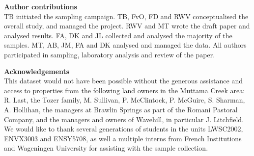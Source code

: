 \documentclass[, manuscript]{copernicus}
\begin{document}
\bigskip

\noindent \textbf{Author contributions}\\
TB initiated the sampling campaign. TB, FvO, FD and RWV conceptualised
the overall study, and managed the project. RWV and MT wrote the draft
paper and analysed results. FA, DK and JL collected and analysed the
majority of the samples. MT, AB, JM, FA and DK analysed and managed the
data. All authors participated in sampling, laboratory analysis and
review of the paper.

\bigskip

\noindent \textbf{Acknowledgements}\\
This dataset would not have been possible without the generous
assistance and access to properties from the following land owners in
the Muttama Creek area: R. Last, the Tozer family, M. Sullivan, P.
McClintock, P. McGuire, S. Sharman, A. Hollihan, the managers at Brawlin
Springs as part of the Romani Pastoral Company, and the managers and
owners of Wavehill, in particular J. Litchfield. We would like to thank
several generations of students in the units LWSC2002, ENVX3003 and
ENSY5708, as well a multiple interns from French Institutions and
Wageningen University for assisting with the sample collection.









\competinginterests{} %







\end{document}
